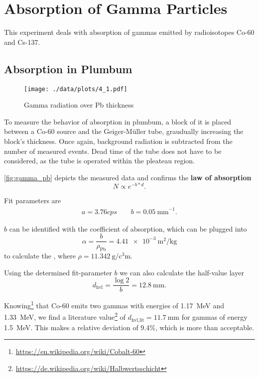 \chapter{Absorption of Gamma Particles}
This experiment deals with absorption of gammas emitted by radioisotopes Co-60 and Cs-137.

\section{Absorption in Plumbum}
\begin{figure}[ht!]
	\centering
	\texttt{[image: ./data/plots/4\_1.pdf]}
	\caption[Gamma radiation over Pb thickness]{Gamma radiation over Pb thickness}
	\label{fig:gamma_pb}
\end{figure}
To measure the behavior of absorption in plumbum, a block of it is placed between a Co-60 source and the Geiger-Müller tube, graudually increasing the block's thickness.
Once again, background radiation is subtracted from the number of measured events.
Dead time of the tube does not have to be considered, as the tube is operated within the pleateau region.

\autoref{fig:gamma_pb} depicts the measured data and confirms the \textbf{law of absorption}
\begin{equation*}
	N\propto e^{-b*d}.
\end{equation*}

Fit parameters are
\begin{gather*}
	a=\num{3.76}cps\qquad b=\SI{0.05}{\milli\meter}^{-1}.
\end{gather*}

$b$ can be identified with the coefficient of absorption, which can be plugged into
\begin{equation*}
	\alpha=\frac{b}{\rho_\text{Pb}}=\SI{4.41e-3}{\meter\squared\per\kilogram}
\end{equation*}
to calculate the , where $\rho=\SI{11.342}{\gram\per\cubic\centi\meter}$.

Using the determined fit-parameter $b$ we can also calculate the half-value layer
\begin{equation*}
	d_\text{hvl}=\frac{\log{2}}{b}=\SI{12.8}{\milli\meter}.
\end{equation*}

Knowing\footnote{\href{https://en.wikipedia.org/wiki/Cobalt-60}{https://en.wikipedia.org/wiki/Cobalt-60}} that Co-60 emits two gammas with energies of \SI{1.17}{\mega\electronvolt} and \SI{1.33}{\mega\electronvolt}, we find a literature value\footnote{\href{de.wikipedia.org/wiki/Halbwertsschicht}{https://de.wikipedia.org/wiki/Halbwertsschicht}} of $d_\text{hvl,lit}=\SI{11.7}{\milli\meter}$ for gammas of energy \SI{1.5}{\mega\electronvolt}.
This makes a relative deviation of \num{9.4}\%, which is more than acceptable.
